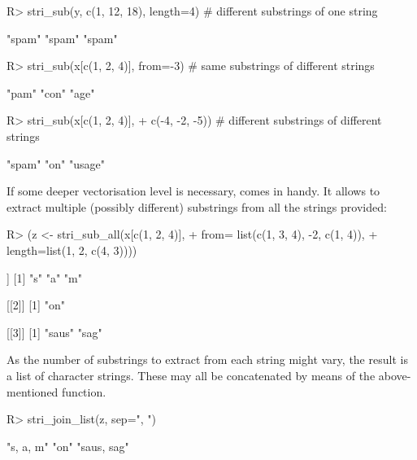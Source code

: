 \documentclass[nojss]{jss}
\begin{document}
\begin{Schunk}
\begin{Sinput}
R> stri_sub(y, c(1, 12, 18), length=4)  # different substrings of one string
\end{Sinput}
\begin{Soutput}
[1] "spam" "spam" "spam"
\end{Soutput}
\begin{Sinput}
R> stri_sub(x[c(1, 2, 4)], from=-3)    # same substrings of different strings
\end{Sinput}
\begin{Soutput}
[1] "pam" "con" "age"
\end{Soutput}
\begin{Sinput}
R> stri_sub(x[c(1, 2, 4)],
+      c(-4, -2, -5))  # different substrings of different strings
\end{Sinput}
\begin{Soutput}
[1] "spam"  "on"    "usage"
\end{Soutput}
\end{Schunk}

If some deeper vectorisation level is necessary, 
comes in handy. It allows to extract multiple (possibly different) substrings
from all the strings provided:


\begin{Schunk}
\begin{Sinput}
R> (z <- stri_sub_all(x[c(1, 2, 4)],
+      from=  list(c(1, 3, 4), -2, c(1, 4)),
+      length=list(1,           2, c(4, 3))))
\end{Sinput}
\begin{Soutput}
[[1]]
[1] "s" "a" "m"

[[2]]
[1] "on"

[[3]]
[1] "saus" "sag"
\end{Soutput}
\end{Schunk}

As the number of substrings to extract from each string might vary, the result is a list
of character strings. These may all be concatenated by means of the
above-mentioned  function.

\begin{Schunk}
\begin{Sinput}
R> stri_join_list(z, sep=", ")
\end{Sinput}
\begin{Soutput}
[1] "s, a, m"   "on"        "saus, sag"
\end{Soutput}
\end{Schunk}
\end{document}
